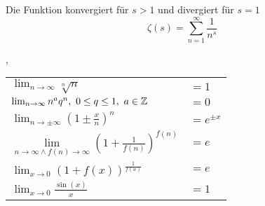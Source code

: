  Die Funktion konvergiert für $s>1$ und divergiert für $s=1$
$$\zeta(s)=\sum_{n=1}^{\infty} \frac{1}{n^{s}}$$

\sep
\begin{table}[H]
\centering
\begin{tabular}{p{4.5cm}p{1cm}}
$\lim_{n \rightarrow \infty} \sqrt[n]{n}$ & $=1$
\\
$\lim_{n \rightarrow \infty} n^{a}q^{n}, \ 0 \leq q \leq 1, \ a \in \mathbb{Z}$ & $=0$
\\
\midrule
$\lim _{n \rightarrow \pm \infty}\left(1 \pm \frac{x}{n}\right)^{n}$&$=e^{\pm x}$
\\
$\lim \limits_{n \rightarrow \infty \land f(n) \rightarrow \infty}\left(1+\frac{1}{f(n)}\right)^{f(n)}$ & $=e$
\\
$\lim _{x \rightarrow 0}(1+f(x))^{\frac{1}{f(x)}}$ & $=e$
\\
\midrule
$\lim _{x \rightarrow 0} \frac{\sin (x)}{x}$&$=1$
\end{tabular}
\end{table}